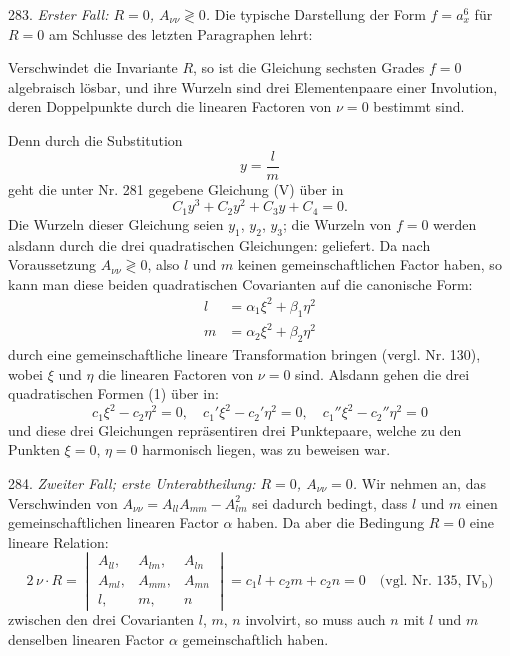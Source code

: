 283. \textit{Erster Fall: $R=0$, $A_{\nu\nu}\gtrless 0$.} Die typische Darstellung der Form $f=a_x^6$ für $R=0$ am Schlusse des letzten Paragraphen lehrt:

\glqq Verschwindet die Invariante $R$, so ist die Gleichung sechsten Grades $f=0$ algebraisch lösbar, und ihre Wurzeln sind drei Elementenpaare einer Involution, deren Doppelpunkte durch die linearen Factoren von $\nu=0$ bestimmt sind.\grqq{}

Denn durch die Substitution
\[
y=\frac{l}{m}
\]
geht die unter Nr. 281 gegebene Gleichung (V) über in
\[
C_1y^3+C_2y^2+C_3y+C_4=0.
\]
Die Wurzeln dieser Gleichung seien $y_1$, $y_2$, $y_3$; die Wurzeln von $f=0$ werden alsdann durch die drei quadratischen Gleichungen:
geliefert. Da nach Voraussetzung $A_{\nu\nu}\gtrless 0$, also $l$ und $m$ keinen gemeinschaftlichen Factor haben, so kann man diese beiden quadratischen Covarianten auf die canonische Form:
\[
\begin{aligned}
l&=\alpha_1\xi^2+\beta_1\eta^2\\
m&=\alpha_2\xi^2+\beta_2\eta^2
\end{aligned}
\]
durch eine gemeinschaftliche lineare Transformation bringen (vergl. Nr. 130), wobei $\xi$ und $\eta$ die linearen Factoren von $\nu=0$ sind. Alsdann gehen die drei quadratischen Formen (1) über in:
\[
c_1\xi^2-c_2\eta^2=0,\quad c_1'\xi^2-c_2'\eta^2=0,\quad c_1''\xi^2-c_2''\eta^2=0
\]
und diese drei Gleichungen repräsentiren drei Punktepaare, welche zu den Punkten $\xi=0$, $\eta=0$ harmonisch liegen, was zu beweisen war.


284. \textit{Zweiter Fall; erste Unterabtheilung: $R=0$, $A_{\nu\nu}=0$.} Wir nehmen an, das Verschwinden von $A_{\nu\nu}=A_{ll}A_{mm}-A_{lm}^2$ sei dadurch bedingt, dass $l$ und $m$ einen gemeinschaftlichen linearen Factor $\alpha$ haben. Da aber die Bedingung $R=0$ eine lineare Relation:
\[
2\,\nu\cdot R=\begin{vmatrix}A_{ll}, & A_{lm}, & A_{ln}\\ A_{ml}, & A_{mm}, & A_{mn}\\ l, & m, & n\end{vmatrix}=c_1l+c_2m+c_2n=0%
\quad\text{(vgl. Nr. 135, IV$_{\text{b}}$)}
\]
zwischen den drei Covarianten $l$, $m$, $n$ involvirt, so muss auch $n$ mit $l$ und $m$ denselben linearen Factor $\alpha$ gemeinschaftlich haben.


